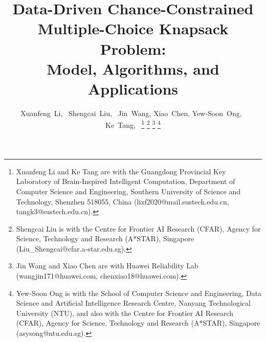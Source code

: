 \documentclass[lettersize,journal]{IEEEtran}
\begin{document}
%
\title{Data-Driven Chance-Constrained Multiple-Choice Knapsack Problem:\\Model, Algorithms, and Applications}
%
%
%

\author{Xuanfeng~Li,~
        Shengcai~Liu,~
        Jin~Wang,
        Xiao~Chen,
        Yew-Soon~Ong,~
        Ke~Tang,~
\thanks{Xuanfeng Li and Ke Tang are with the Guangdong Provincial Key Laboratory of Brain-Inspired Intelligent Computation, Department of
Computer Science and Engineering, Southern University of Science and Technology, Shenzhen 518055, China (lixf2020@mail.sustech.edu.cn, tangk3@sustech.edu.cn).}
\thanks{Shengcai Liu is with the Centre for Frontier AI Research (CFAR), Agency for Science, Technology and Research (A*STAR), Singapore (Liu\_Shengcai@cfar.a-star.edu.sg).}
\thanks{Jin Wang and Xiao Chen are with Huawei Reliability Lab (wangjin171@huawei.com, chenxiao18@huawei.com).}
\thanks{Yew-Soon Ong is with the School of Computer Science and Engineering, Data Science and Artificial Intelligence Research Centre, Nanyang Technological University (NTU), and also with the Centre for Frontier AI Research (CFAR), Agency for Science, Technology and Research (A*STAR), Singapore (asysong@ntu.edu.sg).}
}
\end{document}
